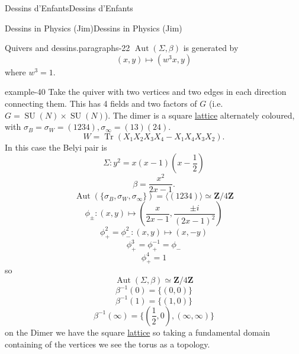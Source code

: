 \documentclass[10pt,]{book}
\numberwithin{equation}{section}
\newcommand{\inv}{^{-1}}
\newcommand{\ZZ}{\mathbf{Z}}
\DeclareMathOperator{\trace}{Tr}
\DeclareMathOperator{\Aut}{Aut}
\DeclareMathOperator{\specialunitary}{SU}
\begin{document}
\begin{chapterptx}{Dessins d'Enfants}{}{Dessins d'Enfants}{}{}
\begin{sectionptx}{Dessins in Physics (Jim)}{}{Dessins in Physics (Jim)}{}{}
\begin{paragraphs}{Quivers and dessins.}{paragraphs-22}
\(\Aut(\Sigma, \beta)\) is generated by%
\begin{equation*}
(x,y) \mapsto (w^3 x,y)
\end{equation*}
where \(w^3 = 1\).%
\begin{example}{}{example-40}%
\hypertarget{p-780}{}%
Take the quiver with two vertices and two edges in each direction connecting them. This has 4 fields and two factors of \(G\) (i.e. \(G = \specialunitary (N) \times \specialunitary (N)\)). The dimer is a square \hyperref[def-buntes-lattice]{lattice} alternately coloured, with \(\sigma_B = \sigma_W = (1234), \sigma_\infty = (13)(24)\).%
\begin{equation*}
W = \trace (X_1X_2X_3X_4 - X_1 X_4 X_3 X_2)\text{.}
\end{equation*}
In this case the Belyi pair is%
\begin{equation*}
\Sigma \colon y^2= x(x-1)(x-\frac12)
\end{equation*}
%
\begin{equation*}
\beta = \frac{x^2}{2x-1}\text{.}
\end{equation*}
%
\begin{equation*}
\Aut(\{\sigma_B,\sigma_W, \sigma_\infty\}) = \langle (1234) \rangle \simeq \ZZ/4\ZZ
\end{equation*}
%
\begin{equation*}
\phi_\pm \colon (x,y) \mapsto \left(\frac{x}{2x -1},\frac{\pm i}{(2x-1)^2} \right)
\end{equation*}
%
\begin{equation*}
\phi_+^2 = \phi_-^2 \colon (x,y) \mapsto (x,-y)
\end{equation*}
%
\begin{equation*}
\phi_+^3 = \phi_+\inv = \phi_-
\end{equation*}
%
\begin{equation*}
\phi_+^4 = 1
\end{equation*}
so%
\begin{equation*}
\Aut(\Sigma, \beta) \simeq \ZZ/4\ZZ
\end{equation*}
%
\begin{equation*}
\beta\inv(0)= \{(0,0)\}
\end{equation*}
%
\begin{equation*}
\beta\inv(1)= \{(1,0)\}
\end{equation*}
%
\begin{equation*}
\beta\inv(\infty)= \{(\frac 12,0), (\infty,\infty)\}
\end{equation*}
on the Dimer we have the square \hyperref[def-buntes-lattice]{lattice} so taking a fundamental domain containing  of the vertices we see the torus as a topology.%

\end{example}
\end{paragraphs}
\end{sectionptx}
\end{chapterptx}
\end{document}
